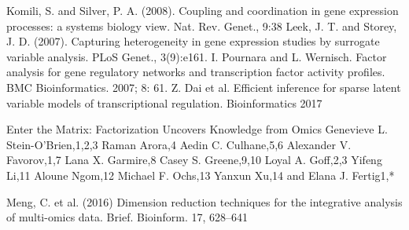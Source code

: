 	Komili, S. and Silver, P. A. (2008). Coupling and coordination in gene expression processes: a systems biology view. Nat. Rev. Genet., 9:38
	Leek, J. T. and Storey, J. D. (2007). Capturing heterogeneity in gene expression studies by surrogate variable analysis. PLoS Genet., 3(9):e161.
	I. Pournara and L. Wernisch. Factor analysis for gene regulatory networks and transcription factor activity profiles. BMC Bioinformatics. 2007; 8: 61.
	Z. Dai et al.  Efficient inference for sparse latent variable models of transcriptional regulation. Bioinformatics 2017

	Enter the Matrix: Factorization Uncovers Knowledge from Omics
		Genevieve L. Stein-O’Brien,1,2,3 Raman Arora,4 Aedin C. Culhane,5,6 Alexander V. Favorov,1,7
		Lana X. Garmire,8 Casey S. Greene,9,10 Loyal A. Goff,2,3 Yifeng Li,11 Aloune Ngom,12
		Michael F. Ochs,13 Yanxun Xu,14 and Elana J. Fertig1,*

	Meng, C. et al. (2016) Dimension reduction techniques for the integrative analysis of multi-omics data. Brief. Bioinform. 17, 628–641